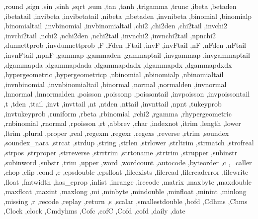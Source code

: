 {{    ,round
    ,sign
    ,sin
    ,sinh
    ,sqrt
    ,sum
    ,tan
    ,tanh
    ,trigamma
    ,trunc
    ,ibeta
    ,betaden
    ,ibetatail
    ,invibeta
    ,invibetatail
    ,nibeta
    ,nbetaden
    ,invnibeta
    ,binomial
    ,binomialp
    ,binomialtail
    ,invbinomial
    ,invbinomialtail
    ,chi2
    ,chi2den
    ,chi2tail
    ,invchi2
    ,invchi2tail
    ,nchi2
    ,nchi2den
    ,nchi2tail
    ,invnchi2
    ,invnchi2tail
    ,npnchi2
    ,dunnettprob
    ,invdunnettprob
    ,F
    ,Fden
    ,Ftail
    ,invF
    ,invFtail
    ,nF
    ,nFden
    ,nFtail
    ,invnFtail
    ,npnF
    ,gammap
    ,gammaden
    ,gammaptail
    ,invgammap
    ,invgammaptail
    ,dgammapda
    ,dgammapdada
    ,dgammapdadx
    ,dgammapdx
    ,dgammapdxdx
    ,hypergeometric
    ,hypergeometricp
    ,nbinomial
    ,nbinomialp
    ,nbinomialtail
    ,invnbinomial
    ,invnbinomialtail
    ,binormal
    ,normal
    ,normalden
    ,invnormal
    ,lnnormal
    ,lnnormalden
    ,poisson
    ,poissonp
    ,poissontail
    ,invpoisson
    ,invpoissontail
    ,t
    ,tden
    ,ttail
    ,invt
    ,invttail
    ,nt
    ,ntden
    ,nttail
    ,invnttail
    ,npnt
    ,tukeyprob
    ,invtukeyprob
    ,runiform
    ,rbeta
    ,rbinomial
    ,rchi2
    ,rgamma
    ,rhypergeometric
    ,rnbinomial
    ,rnormal
    ,rpoisson
    ,rt
    ,abbrev
    ,char
    ,indexnot
    ,itrim
    ,length
    ,lower
    ,ltrim
    ,plural
    ,proper
    ,real
    ,regexm
    ,regexr
    ,regexs
    ,reverse
    ,rtrim
    ,soundex
    ,soundex_nara
    ,strcat
    ,strdup
    ,string
    ,strlen
    ,strlower
    ,strltrim
    ,strmatch
    ,strofreal
    ,strpos
    ,strproper
    ,strreverse
    ,strrtrim
    ,strtoname
    ,strtrim
    ,strupper
    ,subinstr
    ,subinword
    ,substr
    ,trim
    ,upper
    ,word
    ,wordcount
    ,autocode
    ,byteorder
    ,c
    ,_caller
    ,chop
    ,clip
    ,cond
    ,e
    ,epsdouble
    ,epsfloat
    ,fileexists
    ,fileread
    ,filereaderror
    ,filewrite
    ,float
    ,fmtwidth
    ,has_eprop
    ,inlist
    ,inrange
    ,irecode
    ,matrix
    ,maxbyte
    ,maxdouble
    ,maxfloat
    ,maxint
    ,maxlong
    ,mi
    ,minbyte
    ,mindouble
    ,minfloat
    ,minint
    ,minlong
    ,missing
    ,r
    ,recode
    ,replay
    ,return
    ,s
    ,scalar
    ,smallestdouble
    ,bofd
    ,Cdhms
    ,Chms
    ,Clock
    ,clock
    ,Cmdyhms
    ,Cofc
    ,cofC
    ,Cofd
    ,cofd
    ,daily
    ,date
}}
